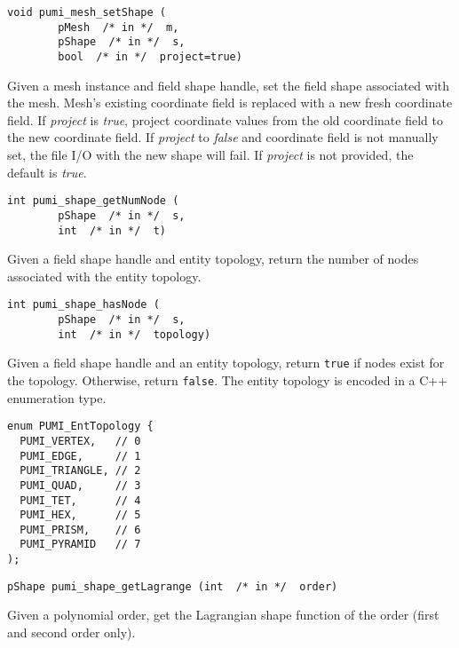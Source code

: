 \begin{verbatim}
void pumi_mesh_setShape (
        pMesh  /* in */  m,
        pShape  /* in */  s, 
        bool  /* in */  project=true)
\end{verbatim}\vspace{-.5cm}\hspace{1cm}
Given a mesh instance and field shape handle, set the field shape associated with the mesh. Mesh's existing coordinate field is replaced with a new fresh coordinate field. If \emph{project} is \emph{true}, project coordinate values from the old coordinate field to the new coordinate field. If \emph{project} to \emph{false} and coordinate field is not manually set, the file I/O with the new shape will fail. If \emph{project} is not provided, the default is \emph{true}.

\begin{verbatim}
int pumi_shape_getNumNode (
        pShape  /* in */  s, 
        int  /* in */  t)
\end{verbatim}\vspace{-.5cm}\hspace{1cm}
Given a field shape handle and entity topology, return the number of nodes associated with the entity topology.

\begin{verbatim}
int pumi_shape_hasNode (
        pShape  /* in */  s, 
        int  /* in */  topology)
\end{verbatim}\vspace{-.5cm}\hspace{1cm}
Given a field shape handle and an entity topology, return \texttt{true} if nodes exist for the topology. Otherwise, return \texttt{false}. The entity topology is encoded in a C++ enumeration type.
\begin{verbatim}
enum PUMI_EntTopology {
  PUMI_VERTEX,   // 0
  PUMI_EDGE,     // 1
  PUMI_TRIANGLE, // 2
  PUMI_QUAD,     // 3
  PUMI_TET,      // 4
  PUMI_HEX,      // 5
  PUMI_PRISM,    // 6
  PUMI_PYRAMID   // 7
);
\end{verbatim}\vspace{-.5cm}\hspace{1cm}

\begin{verbatim}
pShape pumi_shape_getLagrange (int  /* in */  order)
\end{verbatim}\vspace{-.5cm}\hspace{1cm}
Given a polynomial order, get the Lagrangian shape function of the order (first and second order only).

